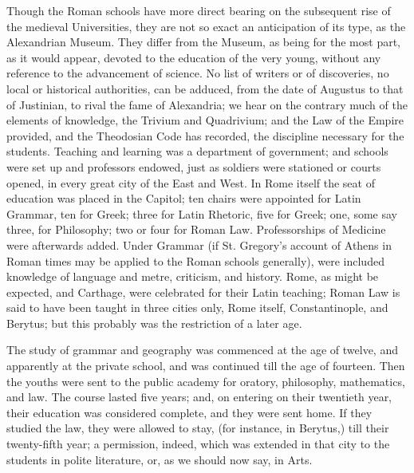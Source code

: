 Though the Roman schools have more direct bearing on the subsequent
rise of the medieval Universities, they are not so exact an
anticipation of its type, as the Alexandrian Museum. They differ from
the Museum, as being for the most part, as it would appear, devoted to
the education of the very young, without any reference to the
advancement of science. No list of writers or of discoveries, no local
or historical authorities, can be adduced, from the date of Augustus
to that of Justinian, to rival the fame of Alexandria; we hear on the
contrary much of the elements of knowledge, the Trivium and
Quadrivium; and the Law of the Empire provided, and the Theodosian
Code has recorded, the discipline necessary for the students. Teaching
and learning was a department of government; and schools were set up
and professors endowed, just as soldiers were stationed or courts
opened, in every great city of the East and West. In Rome itself the
seat of education was placed in the Capitol; ten chairs were
appointed for Latin Grammar, ten for Greek; three for Latin Rhetoric,
five for Greek; one, some say three, for Philosophy; two or four for
Roman Law. Professorships of Medicine were afterwards added. Under
Grammar (if St. Gregory's account of Athens in Roman times may be
applied to the Roman schools generally), were included knowledge of
language and metre, criticism, and history. Rome, as might be
expected, and Carthage, were celebrated for their Latin teaching;
Roman Law is said to have been taught in three cities only, Rome
itself, Constantinople, and Berytus; but this probably was the
restriction of a later age.

The study of grammar and geography was commenced at the age of
twelve, and apparently at the private school, and was continued till
the age of fourteen. Then the youths were sent to the public academy
for oratory, philosophy, mathematics, and law. The course lasted five
years; and, on entering on their twentieth year, their education was
considered complete, and they were sent home. If they studied the law,
they were allowed to stay, (for instance, in Berytus,) till their
twenty-fifth year; a permission, indeed, which was extended in that
city to the students in polite literature, or, as we should now say,
in Arts.


